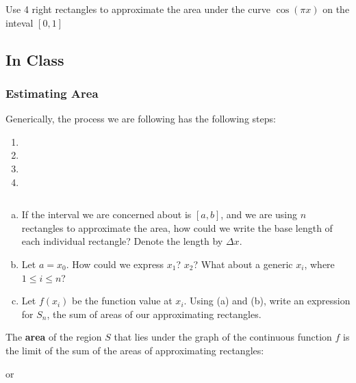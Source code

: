 \documentclass[notes]{subfiles}
\begin{document}
		\begin{ex}
			Use 4 right rectangles to approximate the area under the curve \(\cos (\pi x)\) on the inteval \([0,1]\)
		\end{ex}
			
		\newpage
		
	\subsection*{In Class}
	\subsubsection*{Estimating Area}
		Generically, the process we are following has the following steps:
		\begin{rmk}
			\begin{enumerate}[(1)]
			\setlength\itemsep{30pt}
				\item 
				\item 
				\item 
				\item 
			\end{enumerate}
		\end{rmk}
		
		\begin{question}$ $
			\begin{enumerate}[(a)]
				\item If the interval we are concerned about is \([a,b]\), and we are using \(n\) rectangles to approximate the area, how could we write the base length of each individual rectangle?  Denote the length by \(\Delta x\).
					
				\item Let \(a = x_0\).  How could we express \(x_1\)?  \(x_2\)?  What about a generic \(x_i\), where \(1\leq i\leq n\)?
					
				\item Let \(f(x_i)\) be the function value at \(x_i\).  Using (a) and (b), write an expression for \(S_n\), the sum of areas of our approximating rectangles.
			\end{enumerate}
		\end{question}
			\newpage
			
		\begin{defn}
			The \textbf{area} of the region $S$ that lies under the graph of the continuous function $f$ is the limit of the sum of the areas of approximating rectangles:\\
					\vspace{.5in}
				
				or
				
					\vspace{.5in}		
		\end{defn}
			
\end{document}
